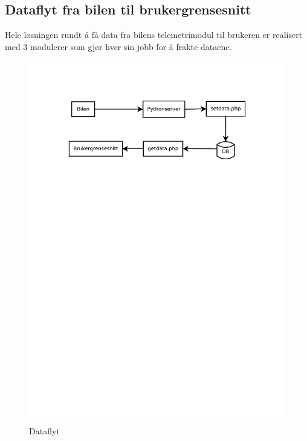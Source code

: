 \subsection{Dataflyt fra bilen til brukergrensesnitt}
Hele løsningen rundt å få data fra bilens telemetrimodul til brukeren er realisert med 3 modulerer som gjør hver sin jobb for å frakte dataene.
\begin{figure}[H]
\caption{Dataflyt} 
\label{dataflow}
\includegraphics[width=\textwidth, trim=0 550 0 75]{images/dataflow.pdf}
\end{figure}
